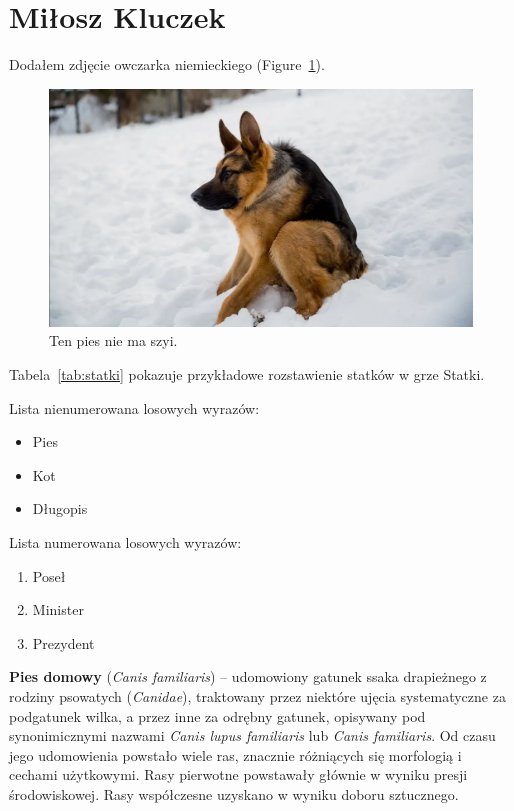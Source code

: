 \section{Miłosz Kluczek}
\label{sec:kluczek}

Dodałem zdjęcie owczarka niemieckiego (Figure~\ref{fig:owcz}).

\begin{figure}[htbp] %
    \centering
    \includegraphics[width=1\textwidth]{pictures/owczarek.png} 
    \caption{Ten pies nie ma szyi.}
    \label{fig:owcz}
\end{figure}

\hline \hspace{1cm}




Tabela~\ref{tab:statki} pokazuje przykładowe rozstawienie statków w grze Statki. 



\hline \hspace{1cm}

Lista nienumerowana losowych wyrazów:
\begin{itemize}
  \item Pies
  \item Kot
  \item Długopis 
\end{itemize}

Lista numerowana losowych wyrazów:
\begin{enumerate}
    \item Poseł
    \item Minister
    \item Prezydent
\end{enumerate}

\newpage


\textbf{Pies domowy} (\textit{Canis familiaris}) – udomowiony gatunek ssaka drapieżnego z rodziny psowatych (\textit{Canidae}), traktowany przez niektóre ujęcia systematyczne za podgatunek wilka, a przez inne za odrębny gatunek, opisywany pod synonimicznymi nazwami \textit{Canis lupus familiaris} lub \textit{Canis familiaris}. Od czasu jego udomowienia powstało wiele ras, znacznie różniących się morfologią i cechami użytkowymi. Rasy pierwotne powstawały głównie w wyniku presji środowiskowej. Rasy współczesne uzyskano w wyniku doboru sztucznego.

